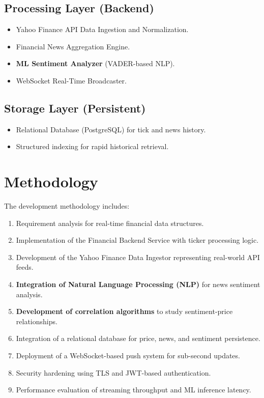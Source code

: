 \subsection*{Processing Layer (Backend)}
\begin{itemize}
    \item Yahoo Finance API Data Ingestion and Normalization.
    \item Financial News Aggregation Engine.
    \item \textbf{ML Sentiment Analyzer} (VADER-based NLP).
    \item WebSocket Real-Time Broadcaster.
\end{itemize}

\subsection*{Storage Layer (Persistent)}
\begin{itemize}
    \item Relational Database (PostgreSQL) for tick and news history.
    \item Structured indexing for rapid historical retrieval.
\end{itemize}

\section{Methodology}

The development methodology includes:

\begin{enumerate}
    \item Requirement analysis for real-time financial data structures.
    \item Implementation of the Financial Backend Service with ticker processing logic.
    \item Development of the Yahoo Finance Data Ingestor representing real-world API feeds.
    \item \textbf{Integration of Natural Language Processing (NLP)} for news sentiment analysis.
    \item \textbf{Development of correlation algorithms} to study sentiment-price relationships.
    \item Integration of a relational database for price, news, and sentiment persistence.
    \item Deployment of a WebSocket-based push system for sub-second updates.
    \item Security hardening using TLS and JWT-based authentication.
    \item Performance evaluation of streaming throughput and ML inference latency.
\end{enumerate}

